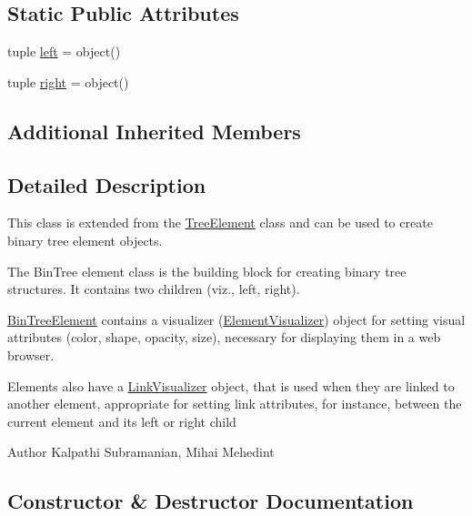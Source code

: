 \subsection*{Static Public Attributes}
\begin{DoxyCompactItemize}
\item 
tuple \hyperlink{class_bridges_1_1_bin_tree_element_1_1_bin_tree_element_af5631062deb9040b39ed0f1c44047997}{left} = object()
\item 
tuple \hyperlink{class_bridges_1_1_bin_tree_element_1_1_bin_tree_element_ae2e489fc41e232af5467eb2e48692f67}{right} = object()
\end{DoxyCompactItemize}
\subsection*{Additional Inherited Members}


\subsection{Detailed Description}
This class is extended from the \hyperlink{namespace_bridges_1_1_tree_element}{Tree\+Element} class and can be used to create binary tree element objects. 

The Bin\+Tree element class is the building block for creating binary tree structures. It contains two children (viz., left, right).

\hyperlink{class_bridges_1_1_bin_tree_element_1_1_bin_tree_element}{Bin\+Tree\+Element} contains a visualizer (\hyperlink{namespace_bridges_1_1_element_visualizer}{Element\+Visualizer}) object for setting visual attributes (color, shape, opacity, size), necessary for displaying them in a web browser.

Elements also have a \hyperlink{namespace_bridges_1_1_link_visualizer}{Link\+Visualizer} object, that is used when they are linked to another element, appropriate for setting link attributes, for instance, between the current element and its left or right child

\begin{DoxyAuthor}{Author}
Kalpathi Subramanian, Mihai Mehedint 
\end{DoxyAuthor}


\subsection{Constructor \& Destructor Documentation}
\hypertarget{class_bridges_1_1_bin_tree_element_1_1_bin_tree_element_a8bd71987fc37ffd587edce7faf3ccec9}{}
